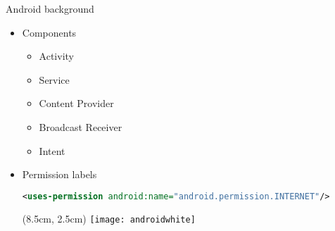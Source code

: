 \begin{frame}[fragile]{Android background}
  \begin{center}
  \begin{itemize}
    \item Components
    \begin{itemize}
      \item <2-> Activity
      \item <3-> Service
      \item <4-> Content Provider
      \item <5-> Broadcast Receiver
      \item <6-> Intent
    \end{itemize}
    \vfill
    \item Permission labels \\ 

\begin{lstlisting}[language=XML]
<uses-permission android:name="android.permission.INTERNET"/>
\end{lstlisting}

  \begin{textblock*}{1cm}(8.5cm, 2.5cm)
    \texttt{[image: androidwhite]}
  \end{textblock*}


  \end{itemize}
  \end{center}
\end{frame}